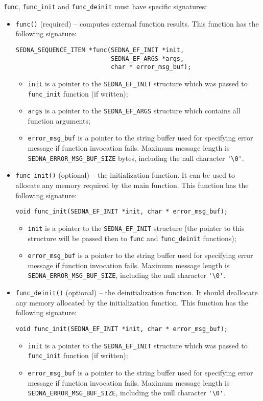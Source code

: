 \documentclass[a4paper,12pt]{article}
\newenvironment{citemize}
{\begin{itemize}
  \setlength{\itemsep}{0pt}
  \setlength{\parskip}{0pt}
  \setlength{\parsep}{0pt}}
{\end{itemize}}
\begin{document}
\verb!func!, \verb!func_init! and \verb!func_deinit! must have specific
signatures:
\begin{itemize}
\item \verb!func()! (required) -- computes external function results. This
function has the following signature:
\begin{verbatim}
SEDNA_SEQUENCE_ITEM *func(SEDNA_EF_INIT *init,
                          SEDNA_EF_ARGS *args,
                          char * error_msg_buf);
\end{verbatim}
\begin{citemize}
\item\verb!init! is a pointer to the \verb!SEDNA_EF_INIT! structure which was
passed to \verb!func_init! function (if written);
\item\verb!args! is a pointer to the \verb!SEDNA_EF_ARGS! structure which
contains all function arguments;
\item\verb!error_msg_buf! is a pointer to the string buffer used for specifying
error message if function invocation fails. Maximum message length is
\verb!SEDNA_ERROR_MSG_BUF_SIZE! bytes, including the null character \verb!'\0'!.
\end{citemize}

\item \verb!func_init()! (optional) -- the initialization function. It can be
used to allocate any memory required by the main function. This function has the
following signature:
\begin{verbatim}
void func_init(SEDNA_EF_INIT *init, char * error_msg_buf);
\end{verbatim}
\begin{citemize}
\item\verb!init! is a pointer to the \verb!SEDNA_EF_INIT! structure (the pointer
to this structure will be passed then to \verb!func! and \verb!func_deinit!
functions);
\item\verb!error_msg_buf! is a pointer to the string buffer used for specifying
error message if function invocation fails. Maximum message length is
\verb!SEDNA_ERROR_MSG_BUF_SIZE!, including the null character \verb!'\0'!.
\end{citemize}

\item \verb!func_deinit()! (optional) -- the deinitialization function. It
should deallocate any memory allocated by the initialization function. This
function has the following signature:
\begin{verbatim}
void func_init(SEDNA_EF_INIT *init, char * error_msg_buf);
\end{verbatim}
\begin{citemize}
\item\verb!init! is a pointer to the \verb!SEDNA_EF_INIT! structure which was
passed to \verb!func_init! function (if written);
\item\verb!error_msg_buf! is a pointer to the string buffer used for specifying
error message if function invocation fails. Maximum message length is
\verb!SEDNA_ERROR_MSG_BUF_SIZE!, including the null character \verb!'\0'!.
\end{citemize}
\end{itemize}
\end{document}
